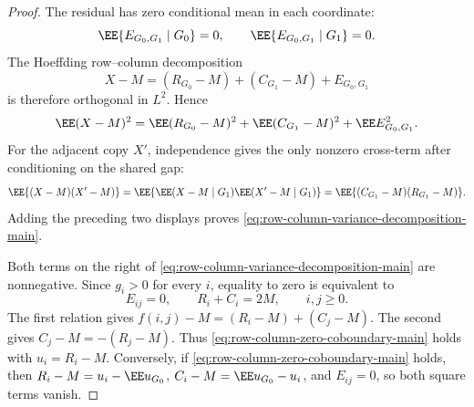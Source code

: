 \begin{proof}
The residual has zero conditional mean in each coordinate:
\[
\EE\{E_{G_0,G_1}\mid G_0\}=0,\qquad
\EE\{E_{G_0,G_1}\mid G_1\}=0 .
\]
The Hoeffding row--column decomposition
\[
X-M=(R_{G_0}-M)+(C_{G_1}-M)+E_{G_0,G_1}
\]
is therefore orthogonal in \(L^2\).  Hence
\[
\EE(X-M)^2
=\EE(R_{G_0}-M)^2+\EE(C_{G_1}-M)^2+\EE E_{G_0,G_1}^2 .
\]
For the adjacent copy \(X'\), independence gives the only nonzero cross-term
after conditioning on the shared gap:
\[
\EE\{(X-M)(X'-M)\}
=\EE\{\EE(X-M\mid G_1)\EE(X'-M\mid G_1)\}
=\EE\{(C_{G_1}-M)(R_{G_1}-M)\}.
\]
Adding the preceding two displays proves
\eqref{eq:row-column-variance-decomposition-main}.

Both terms on the right of
\eqref{eq:row-column-variance-decomposition-main} are nonnegative.  Since
\(g_i>0\) for every \(i\), equality to zero is equivalent to
\[
E_{ij}=0,\qquad R_i+C_i=2M,\qquad i,j\ge0 .
\]
The first relation gives \(f(i,j)-M=(R_i-M)+(C_j-M)\).  The second gives
\(C_j-M=-(R_j-M)\).  Thus
\eqref{eq:row-column-zero-coboundary-main} holds with \(u_i=R_i-M\).
Conversely, if \eqref{eq:row-column-zero-coboundary-main} holds, then
\(R_i-M=u_i-\EE u_{G_0}\), \(C_i-M=\EE u_{G_0}-u_i\), and
\(E_{ij}=0\), so both square terms vanish.
\end{proof}

